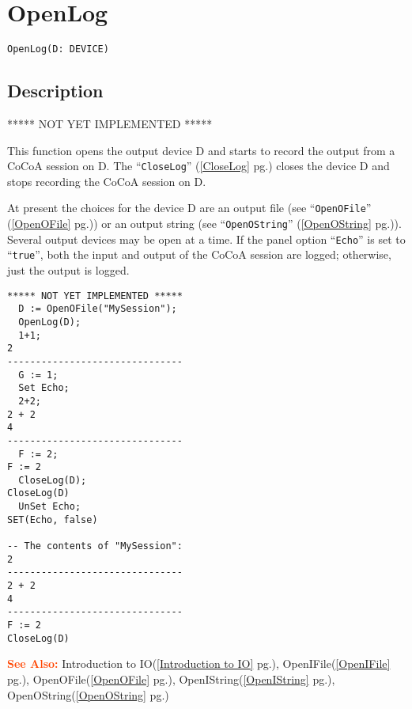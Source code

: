 \documentclass[a4paper]{mybook}
\newenvironment{command}{}{} %
\newcommand\SeeAlso{\par\textcolor{OrangeRed}{\textbf{\large See Also: }}}
\begin{document}
\section{OpenLog}
\label{OpenLog}
\begin{command} %


\begin{Verbatim}[label=syntax, rulecolor=\color{MidnightBlue},
frame=single]
OpenLog(D: DEVICE)
\end{Verbatim}


\subsection*{Description}

***** NOT YET IMPLEMENTED *****
\par 
This function opens the output device D and starts to record the
output from a CoCoA session on D.  The ``\verb&CloseLog&'' (\ref{CloseLog} pg.\pageref{CloseLog}) closes the
device D and stops recording the CoCoA session on D.
\par 
At present the choices for the device D are an output file (see
``\verb&OpenOFile&'' (\ref{OpenOFile} pg.\pageref{OpenOFile})) or an output string (see ``\verb&OpenOString&'' (\ref{OpenOString} pg.\pageref{OpenOString})).  Several output
devices may be open at a time.  If the panel option ``\verb&Echo&'' is set to
``\verb&true&'', both the input and output of the CoCoA session are logged;
otherwise, just the output is logged.
\begin{Verbatim}[label=example, rulecolor=\color{PineGreen}, frame=single]
***** NOT YET IMPLEMENTED *****
  D := OpenOFile("MySession");
  OpenLog(D);
  1+1;
2
-------------------------------
  G := 1;
  Set Echo;
  2+2;
2 + 2
4
-------------------------------
  F := 2;
F := 2
  CloseLog(D);
CloseLog(D)
  UnSet Echo;
SET(Echo, false)

-- The contents of "MySession":
2
-------------------------------
2 + 2
4
-------------------------------
F := 2
CloseLog(D)
\end{Verbatim}


\SeeAlso %
  Introduction to IO(\ref{Introduction to IO} pg.\pageref{Introduction to IO}), 
    OpenIFile(\ref{OpenIFile} pg.\pageref{OpenIFile}), 
    OpenOFile(\ref{OpenOFile} pg.\pageref{OpenOFile}), 
    OpenIString(\ref{OpenIString} pg.\pageref{OpenIString}), 
    OpenOString(\ref{OpenOString} pg.\pageref{OpenOString})
\end{command} %
\end{document}
